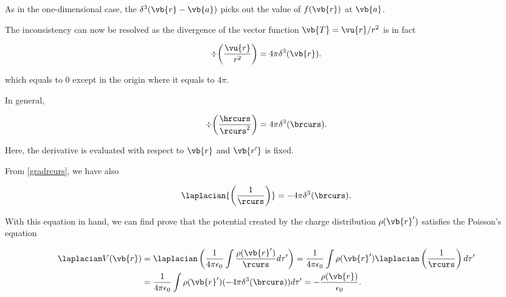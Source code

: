 \documentclass[english,a4paper,12pt]{report}
\begin{document}
As in the one-dimensional case, the \(\delta^3(\vb{r} - \vb{a})\) picks out the value of \(f(\vb{r})\) at \(\vb{a}\).
	
The inconsistency can now be resolved as the divergence of the vector function \(\vb{T} = \vu{r} /r^2\) is in fact
	
\begin{equation} 
	\div{\left(\frac{\vu{r}}{r^2}\right)} = 4\pi\delta^3(\vb{r}). 
\end{equation}
	 
which equals to 0 except in the origin where it equals to \(4\pi\).
	
In general,
	
\begin{equation} 
	\div{\left(\frac{\hrcurs}{\rcurs^2}\right)} = 4\pi\delta^3(\brcurs). \label{divdelta} 
\end{equation} 
 	
Here, the derivative is evaluated with respect to \(\vb{r}\) and \(\vb{r'}\) is fixed.
 	
From \cref{gradrcurs}, we have also
 	
\begin{equation} 
	\laplacian{\left(\frac{1}{\rcurs}\right)} = -4\pi\delta^3(\brcurs). \label{laprj} 
\end{equation}

With this equation in hand, we can find prove that the potential created by the charge distribution \(\rho (\vb{r} ')\) satisfies the Poisson's equation 

\begin{equation}
	\begin{aligned} 
	\laplacian V(\vb{r} ) &= \laplacian  \left( \frac{1}{4\pi \epsilon_0} \int \frac{\rho (\vb{r} ')}{\rcurs }d\tau '  \right) = \frac{1}{4\pi \epsilon_0} \int \rho (\vb{r} ') \laplacian \left( \frac{1}{\rcurs }  \right) d\tau' \\
	&= \frac{1}{4\pi \epsilon_0} \int \rho (\vb{r} ')(-4\pi \delta ^3 (\brcurs ))d\tau ' = -\frac{\rho (\vb{r} )}{\epsilon_0 }.   
	\end{aligned} 
\end{equation}
\end{document}
